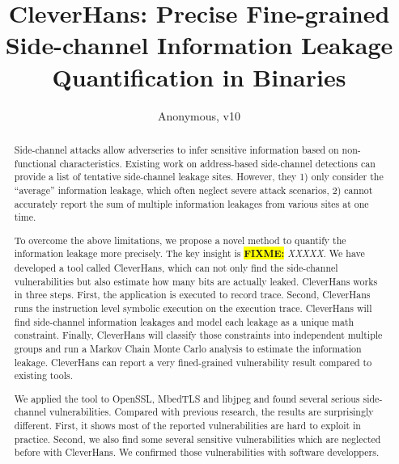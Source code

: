 \documentclass[conference]{IEEEtran}
\newcommand{\highlight}[1]{\colorbox{yellow}{\textbf{#1}}}
\newcommand{\fixme}[1]{\highlight{FIXME:} \emph{#1}}
\newcommand{\tool}{TANA}
\renewcommand{\tool}{CleverHans}
\begin{document}
\title{\tool{}: Precise Fine-grained Side-channel Information Leakage Quantification in Binaries}
\author{Anonymous, v10}

\maketitle

\begin{abstract}
    Side-channel attacks allow adverseries to infer sensitive 
    information based on non-functional characteristics. 
    Existing work on address-based side-channel detections 
    can provide a list of tentative side-channel leakage sites. However, they 
    1) only consider the ``average'' information leakage, 
    which often neglect severe attack scenarios,
    2) cannot accurately report
    the sum of multiple information leakages from various sites at one time.
       
    To overcome the above limitations, we propose a novel method
    to quantify the information leakage more precisely.  
    The key insight is \fixme{XXXXX}.
    We have developed a tool called \tool{}, which can not only 
    find the side-channel vulnerabilities but also estimate how many bits are actually leaked. 
    \tool{} works in three steps. First, the application is executed to record 
    trace. Second, \tool{} runs the instruction level symbolic execution on the 
    execution trace. \tool{} will find side-channel information leakages and model each leakage 
    as a unique math constraint. Finally, \tool{} will classify those constraints into 
    independent multiple groups and run a Markov Chain Monte Carlo analysis to estimate the 
    information leakage. \tool{} can report a very fined-grained vulnerability result 
    compared to existing tools.
    
    We applied the tool to OpenSSL, MbedTLS and libjpeg and found several serious side-channel 
    vulnerabilities. Compared with previous research, the results are surprisingly different. 
    First, it shows most of the reported vulnerabilities are hard to exploit in practice. 
    Second, we also find some several sensitive vulnerabilities which are neglected before with \tool{}. 
    We confirmed those vulnerabilities with software developpers.

\end{abstract}

\IEEEpeerreviewmaketitle
{}














\end{document}
